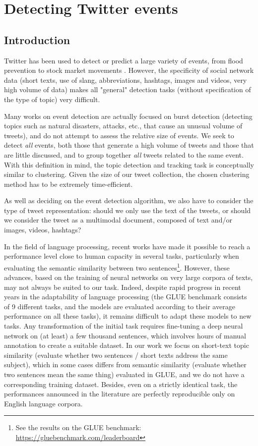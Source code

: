 
\chapter{Detecting Twitter events}


\section{Introduction}
Twitter has been used to detect or predict a large variety of events,
from flood prevention \cite{de2017towards} to stock market movements
\cite{pagolu2016sentiment}. However, the specificity of social network data (short texts, use of
slang, abbreviations, hashtags, images and videos, very
high volume of data) makes all "general" detection tasks
(without specification
of the type of topic)
very difficult.

Many works on event detection are actually
focused on burst detection (detecting topics such as
natural disasters, attacks, etc., that cause an unusual
volume of tweets), and do not attempt to assess the
relative size of events. We seek to detect \textit{all} events, both
those that generate a high volume of tweets and those that
are little discussed, and to group together \textit{all} tweets
related to the same event. With this definition in mind, the
topic detection and tracking task is conceptually similar to 
clustering. Given the size of our tweet collection, 
the chosen clustering method has to be extremely time-efficient.

As well as deciding on the event detection algorithm, 
we also have to consider the type of tweet representation: 
should we only use the text of the tweets, or should we consider 
the tweet as a multimodal document, composed of text and/or images, videos, hashtags?

In the field of language processing, recent works
have made it possible to reach a performance level close to human capacity
in several tasks, 
particularly when evaluating the semantic similarity 
between two sentences\footnote{See the results on the GLUE benchmark: \url{https://gluebenchmark.com/leaderboard}}. However, these advances, 
based on the training of neural networks on very large corpora of texts,
may not always be suited to our task. Indeed, despite rapid progress 
in recent years in the adaptability of
language processing (the GLUE benchmark \cite{wang2018glue} consists of
9 different tasks, and the models are evaluated according to their average performance on
all these tasks), it remains difficult to adapt these models to new tasks. 
Any transformation of the initial task requires fine-tuning a deep neural network 
on (at least) a few thousand sentences, which
involves hours of manual annotation to create a suitable dataset. 
In our work we focus on short-text topic similarity (evaluate whether two sentences / short texts
address the same subject), which in some cases differs from semantic similarity
(evaluate whether two sentences mean the same thing) evaluated in GLUE, and we do not 
have a corresponding training dataset. Besides, even on a strictly identical
task, the performances announced in the literature are perfectly reproducible 
only on English language corpora. 

